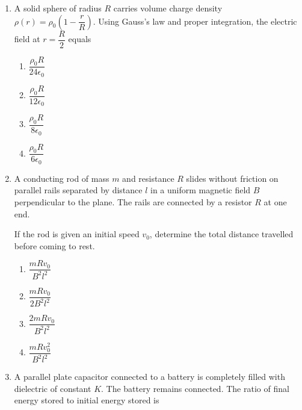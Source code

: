 \documentclass[12pt]{article}
\begin{document}
\begin{enumerate}
\begin{enumerate}
\item $\sqrt{\dfrac{k}{m} - \Omega^2}$
\item $\sqrt{\dfrac{k}{m} - 3\Omega^2}$
\item $\sqrt{\dfrac{k}{m} + \Omega^2}$
\item $\sqrt{\dfrac{k}{m}}$
\end{enumerate}

\item A solid sphere of radius $R$ carries volume charge density $\rho(r)=\rho_0\left(1-\dfrac{r}{R}\right)$. Using Gauss’s law and proper integration, the electric field at $r=\dfrac{R}{2}$ equals

\begin{enumerate}
\item $\dfrac{\rho_0 R}{24\epsilon_0}$
\item $\dfrac{\rho_0 R}{12\epsilon_0}$
\item $\dfrac{\rho_0 R}{8\epsilon_0}$
\item $\dfrac{\rho_0 R}{6\epsilon_0}$
\end{enumerate}

\item A conducting rod of mass $m$ and resistance $R$ slides without friction on parallel rails separated by distance $l$ in a uniform magnetic field $B$ perpendicular to the plane. The rails are connected by a resistor $R$ at one end.

If the rod is given an initial speed $v_0$, determine the total distance travelled before coming to rest.

\begin{enumerate}
\item $\dfrac{mRv_0}{B^2l^2}$
\item $\dfrac{mRv_0}{2B^2l^2}$
\item $\dfrac{2mRv_0}{B^2l^2}$
\item $\dfrac{mRv_0^2}{B^2l^2}$
\end{enumerate}

\item A parallel plate capacitor connected to a battery is completely filled with dielectric of constant $K$. The battery remains connected. The ratio of final energy stored to initial energy stored is


\end{enumerate}
\end{document}
